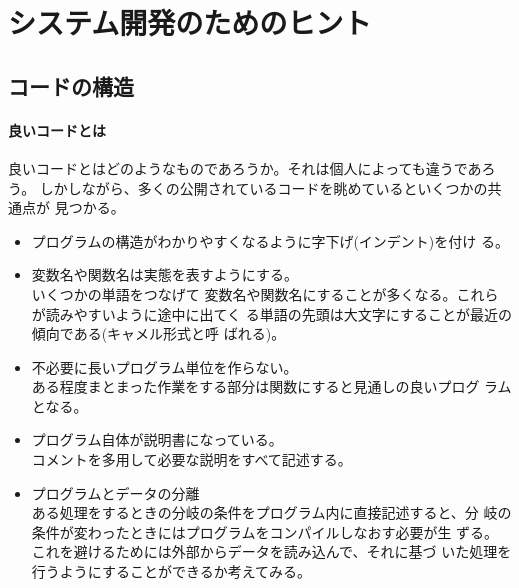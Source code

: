 \chapter{システム開発のためのヒント}
\section{コードの構造}
\subsubsection{良いコードとは}
良いコードとはどのようなものであろうか。それは個人によっても違うであろう。
しかしながら、多くの公開されているコードを眺めているといくつかの共通点が
見つかる。
\begin{itemize}
 \item プログラムの構造がわかりやすくなるように字下げ(インデント)を付け
			 る。
 \item 変数名や関数名は実態を表すようにする。\\いくつかの単語をつなげて
			 変数名や関数名にすることが多くなる。これらが読みやすいように途中に出てく
			 る単語の先頭は大文字にすることが最近の傾向である(キャメル形式と呼
			 ばれる)。
 \item 不必要に長いプログラム単位を作らない。\\
			 ある程度まとまった作業をする部分は関数にすると見通しの良いプログ
			 ラムとなる。
 \item プログラム自体が説明書になっている。\\
			 コメントを多用して必要な説明をすべて記述する。
 \item プログラムとデータの分離\\
			 ある処理をするときの分岐の条件をプログラム内に直接記述すると、分
			 岐の条件が変わったときにはプログラムをコンパイルしなおす必要が生
			 ずる。これを避けるためには外部からデータを読み込んで、それに基づ
			 いた処理を行うようにすることができるか考えてみる。
\end{itemize}

